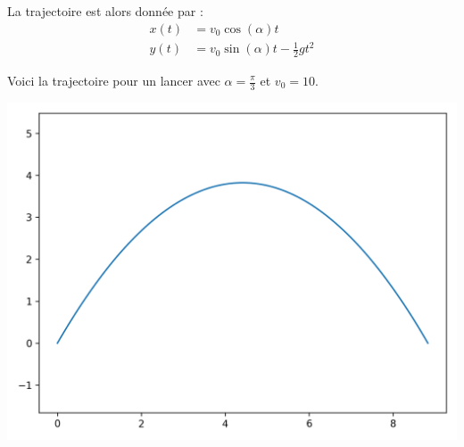 \documentclass[11pt,class=report,crop=false]{standalone}
\begin{document}
La trajectoire est alors donnée par :
\begin{align*}
    x(t) &= v_0 \cos(\alpha) t  \\
    y(t) &= v_0 \sin(\alpha) t - \frac{1}{2} g t^2
\end{align*}

Voici la trajectoire pour un lancer avec $\alpha = \frac\pi3$ et $v_0 = 10$.
\begin{center}
    \includegraphics[scale=\myscale,scale=0.5]{figures/balle1}
\end{center}
\end{document}
